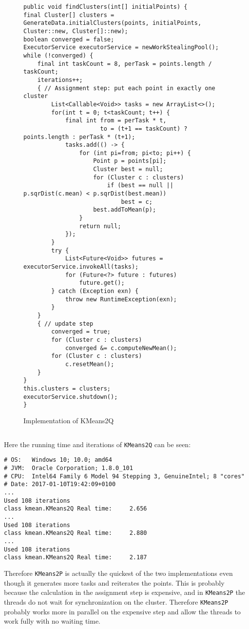\begin{figure}
\begin{lstlisting}
public void findClusters(int[] initialPoints) {
final Cluster[] clusters = GenerateData.initialClusters(points, initialPoints, Cluster::new, Cluster[]::new);
boolean converged = false;
ExecutorService executorService = newWorkStealingPool();
while (!converged) {
    final int taskCount = 8, perTask = points.length / taskCount;
    iterations++;
    { // Assignment step: put each point in exactly one cluster
        List<Callable<Void>> tasks = new ArrayList<>();
        for(int t = 0; t<taskCount; t++) {
            final int from = perTask * t,
                      to = (t+1 == taskCount) ? points.length : perTask * (t+1);
            tasks.add(() -> {
                for (int pi=from; pi<to; pi++) {
                    Point p = points[pi];
                    Cluster best = null;
                    for (Cluster c : clusters)
                        if (best == null || p.sqrDist(c.mean) < p.sqrDist(best.mean))
                            best = c;
                    best.addToMean(p);
                }
                return null;
            });
        }
        try {
            List<Future<Void>> futures = executorService.invokeAll(tasks);
            for (Future<?> future : futures)
                future.get();
        } catch (Exception exn) {
            throw new RuntimeException(exn);
        } 
    }
    { // update step
        converged = true;
        for (Cluster c : clusters)
            converged &= c.computeNewMean();
        for (Cluster c : clusters)
            c.resetMean();
    }
}
this.clusters = clusters;
executorService.shutdown();
}
\end{lstlisting}
\caption{Implementation of KMeans2Q}
\label{code:2:9}
\end{figure}
\clearpage
\subsection{}
Here the running time and iterations of \texttt{KMeans2Q} can be seen: 
\begin{lstlisting}
# OS:   Windows 10; 10.0; amd64
# JVM:  Oracle Corporation; 1.8.0_101
# CPU:  Intel64 Family 6 Model 94 Stepping 3, GenuineIntel; 8 "cores"
# Date: 2017-01-10T19:42:09+0100
...
Used 108 iterations
class kmean.KMeans2Q Real time:     2.656
...
Used 108 iterations
class kmean.KMeans2Q Real time:     2.880
...
Used 108 iterations
class kmean.KMeans2Q Real time:     2.187
\end{lstlisting}

Therefore \texttt{KMeans2P} is actually the quickest of the two implementations even though it generates more tasks and reiterates the points. This is probably because the calculation in the assignment step is expensive, and in \texttt{KMeans2P} the threads do not wait for synchronization on the cluster. Therefore \texttt{KMeans2P} probably works more in parallel on the expensive step and allow the threads to work fully with no waiting time.